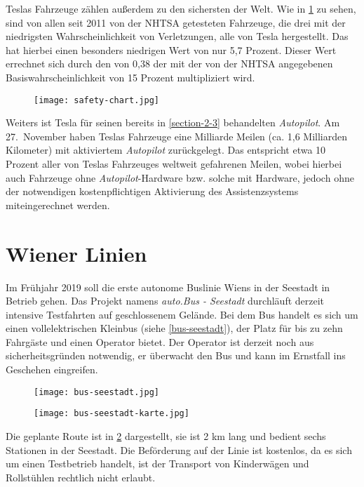 Teslas Fahrzeuge zählen außerdem zu den sichersten der Welt. Wie in \ref{safety-chart} zu sehen, sind von allen seit 2011 von der \ac{NHTSA} getesteten Fahrzeuge, die drei mit der niedrigsten Wahrscheinlichkeit von Verletzungen, alle von Tesla hergestellt. Das  hat hierbei einen besonders niedrigen Wert von nur 5,7 Prozent. Dieser Wert errechnet sich durch den  von 0,38 der mit der von der \ac{NHTSA} angegebenen Basiswahrscheinlichkeit von 15 Prozent multipliziert wird. 

\begin{figure}\centering
  \texttt{[image: safety-chart.jpg]}
  \label{safety-chart}
\end{figure}

Weiters ist Tesla für seinen bereits in \ref{section-2-3} behandelten \textit{Autopilot}. Am 27.\ November haben Teslas Fahrzeuge eine Milliarde Meilen (ca. 1,6 Milliarden Kilometer) mit aktiviertem \textit{Autopilot} zurückgelegt. Das entspricht etwa 10 Prozent aller von Teslas Fahrzeuges weltweit gefahrenen Meilen, wobei hierbei auch Fahrzeuge ohne \textit{Autopilot}-Hardware bzw. solche mit Hardware, jedoch ohne der notwendigen kostenpflichtigen Aktivierung des Assistenzsystems miteingerechnet werden. 


\section{Wiener Linien}

Im Frühjahr 2019 soll die erste autonome Buslinie Wiens in der Seestadt in Betrieb gehen. Das Projekt namens \textit{auto.Bus - Seestadt} durchläuft derzeit intensive Testfahrten auf geschlossenem Gelände. Bei dem Bus handelt es sich um einen vollelektrischen Kleinbus (siehe \ref{bus-seestadt}), der Platz für bis zu zehn Fahrgäste und einen Operator bietet. Der Operator ist derzeit noch aus sicherheitsgründen notwendig, er überwacht den Bus und kann im Ernstfall ins Geschehen eingreifen. 

\begin{figure}\centering
  \texttt{[image: bus-seestadt.jpg]}
  \label{bus-seestadt}

  \texttt{[image: bus-seestadt-karte.jpg]}
  \label{bus-seestadt-karte}
\end{figure}

Die geplante Route ist in \ref{bus-seestadt-karte} dargestellt, sie ist 2 \si{\kilo\metre} lang und bedient sechs Stationen in der Seestadt. Die Beförderung auf der Linie ist kostenlos, da es sich um einen Testbetrieb handelt, ist der Transport von Kinderwägen und Rollstühlen rechtlich nicht erlaubt.
